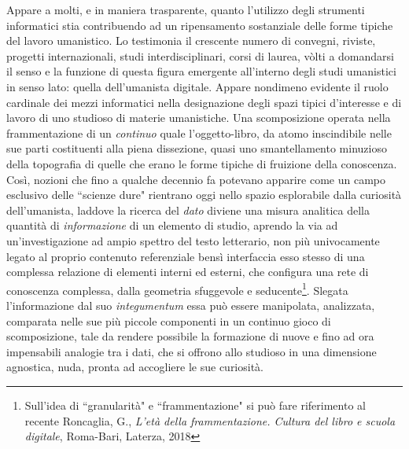 \documentclass[
  b5paper,
  twoside,
  12pt,
  chapterprefix=false,
  bibliography=totocnumbered,
  parskip=false]{scrbook}
\begin{document}
Appare a molti, e in maniera trasparente, quanto l'utilizzo degli strumenti informatici stia contribuendo ad un ripensamento sostanziale delle forme tipiche del lavoro umanistico. Lo testimonia il crescente numero di convegni, riviste, progetti internazionali, studi interdisciplinari, corsi di laurea, vòlti a domandarsi il senso e la funzione di questa figura emergente all'interno degli studi umanistici in senso lato: quella dell'umanista digitale.
Appare nondimeno evidente il ruolo cardinale dei mezzi informatici nella designazione degli spazi tipici d'interesse e di lavoro di uno studioso di materie umanistiche. Una scomposizione operata nella frammentazione di un \emph{continuo} quale l'oggetto-libro, da atomo inscindibile nelle sue parti costituenti alla piena dissezione, quasi uno smantellamento minuzioso della topografia di quelle che erano le forme tipiche di fruizione della conoscenza.
Così, nozioni che fino a qualche decennio fa potevano apparire come un campo esclusivo delle ``scienze dure" rientrano oggi nello spazio esplorabile dalla curiosità dell'umanista, laddove la ricerca del \emph{dato} diviene una misura analitica della quantità di \emph{informazione} di un elemento di studio, aprendo la via ad un'investigazione ad ampio spettro del testo letterario, non più univocamente legato al proprio contenuto referenziale bensì interfaccia esso stesso di una complessa relazione di elementi interni ed esterni, che configura una rete di conoscenza complessa, dalla geometria sfuggevole e seducente\footnote{Sull'idea di ``granularità" e ``frammentazione" si può fare riferimento al recente Roncaglia, G., \emph{L'età della frammentazione. Cultura del libro e scuola digitale}, Roma-Bari, Laterza, 2018}.
Slegata l'informazione dal suo \emph{integumentum} essa può essere manipolata, analizzata, comparata nelle sue più piccole componenti in un continuo gioco di scomposizione, tale da rendere possibile la formazione di nuove e fino ad ora impensabili analogie tra i dati, che si offrono allo studioso in una dimensione agnostica, nuda, pronta ad accogliere le sue curiosità.
\end{document}
